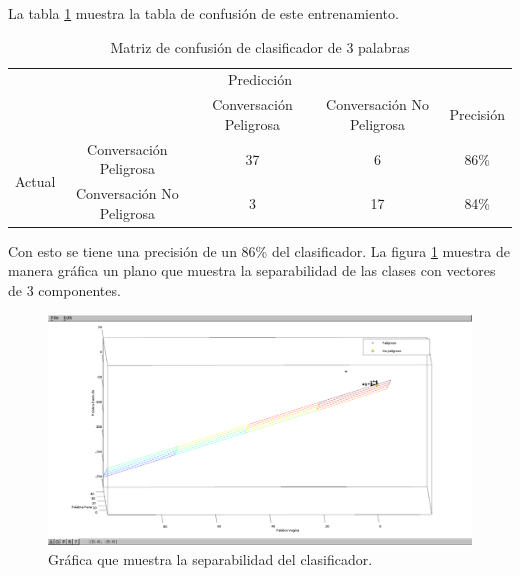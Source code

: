 La tabla \ref{tab:confucion1} muestra la tabla de confusi\'on de este entrenamiento.


\begin{table}[h]
\begin{center}
\begin{tabular}{c|c|c|c|c|}
\multicolumn{5}{c}{Predicci\'on} \\
\cline{2-5}
& & Conversaci\'on Peligrosa & Conversaci\'on No Peligrosa &  Precisi\'on \\
\cline{2-5}
\multirow{2}{*}{Actual} & Conversaci\'on Peligrosa & 37 & 6 & 86\% \\
\cline{2-5}
& Conversaci\'on No Peligrosa &  3 & 17 & 84\% \\
\cline{2-5}

\end{tabular}
\caption{Matriz de confusi\'on de clasificador de 3 palabras}
\label{tab:confucion1}
\end{center}
\end{table}

Con esto se tiene una precisi\'on de un 86\% del clasificador.
La figura \ref{fig:separabilidad} muestra de manera gr\'afica un plano que muestra la separabilidad de las clases con vectores de 3 componentes.

\begin{figure}
	\begin{center}
	\includegraphics[scale=.4]{images/separavilidad}
	\caption{Gr\'afica que muestra la separabilidad del clasificador.}
	\label{fig:separabilidad}
	\end{center}
\end{figure}


